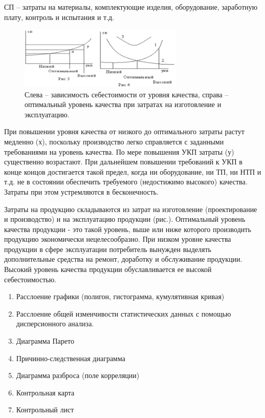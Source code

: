 \documentclass[unicode, 12pt, a4paper, oneside]{article}
\begin{document}
СП – затраты на материалы, комплектующие  изделия, оборудование, заработную плату, контроль и испытания и т.д. 
 \begin{figure}
 \centering 
 \includegraphics[width=0.7\textwidth]{33_Sebestoim.png}
 \caption{Слева -- зависимость себестоимости от уровня качества, справа --оптимальный уровень качества при затратах на изготовление и эксплуатацию.}
 \end{figure}
При повышении уровня качества от низкого до оптимального затраты растут медленно (х), поскольку производство легко справляется с заданными требованиями на уровень качества. По мере повышения УКП затраты (у) существенно возрастают. При дальнейшем повышении требований к УКП в конце концов достигается такой предел, когда ни оборудование, ни ТП, ни НТП и т.д. не в состоянии обеспечить требуемого (недостижимо высокого) качества. Затраты при этом устремляются в бесконечность.

Затраты на продукцию складываются из затрат на изготовление (проектирование и производство) и на эксплуатацию продукции (рис.).
Оптимальный уровень качества продукции - это такой уровень, выше или ниже которого производить продукцию экономически нецелесообразно.
При низком уровне качества продукции в сфере эксплуатации потребитель вынужден выделять дополнительные средства на ремонт, доработку и обслуживание продукции.
Высокий уровень качества продукции обуславливается ее высокой себестоимостью. 


\begin{enumerate}
\item Расслоение графики (полигон, гистограмма, кумулятивная кривая)
\item Расслоение общей изменчивости статистических данных с помощью дисперсионного анализа.
\item Диаграмма Парето
\item Причинно-следственная диаграмма
\item Диаграмма разброса (поле корреляции)
\item Контрольная карта
\item Контрольный лист
\end{enumerate}
\end{document}
